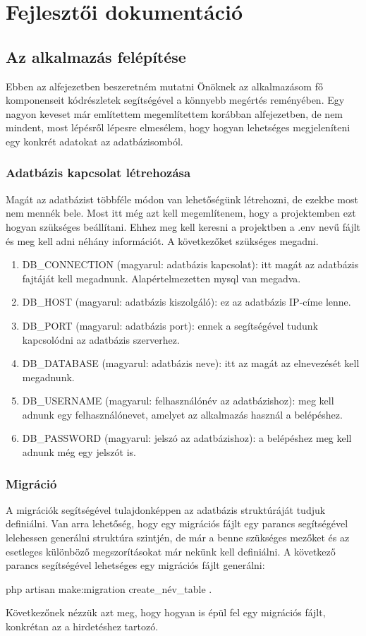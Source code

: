 \documentclass[]{thesis-ekf}
\theoremstyle{definition}
\theoremstyle{remark}
\begin{document}
	\chapter{Fejlesztői dokumentáció}
	\section{Az alkalmazás felépítése}
	Ebben az alfejezetben beszeretném mutatni Önöknek az alkalmazásom fő komponenseit kódrészletek segítségével a könnyebb megértés reményében. Egy nagyon keveset már említettem megemlítettem korábban  alfejezetben, de nem mindent, most lépésről lépesre elmesélem, hogy hogyan lehetséges megjeleníteni egy konkrét adatokat az adatbázisomból.
	\subsection{Adatbázis kapcsolat létrehozása}
	Magát az adatbázist többféle módon van lehetőségünk létrehozni, de ezekbe most nem mennék bele. Most itt még azt kell megemlítenem, hogy a projektemben ezt hogyan szükséges beállítani. Ehhez meg kell keresni a projektben a .env nevű fájlt és meg kell adni néhány információt. A következőket szükséges megadni.
	\begin{enumerate}
		\item DB\_CONNECTION (magyarul: adatbázis kapcsolat): itt magát az adatbázis fajtáját kell megadnunk. Alapértelmezetten mysql van megadva. 
		\item DB\_HOST (magyarul: adatbázis kiszolgáló): ez az adatbázis IP-címe lenne.
		\item DB\_PORT (magyarul: adatbázis port): ennek a segítségével tudunk kapcsolódni az adatbázis szerverhez. 
		\item DB\_DATABASE (magyarul: adatbázis neve): itt az magát az elnevezését kell megadnunk.
		\item DB\_USERNAME (magyarul: felhasználónév az adatbázishoz): meg kell adnunk egy felhasználónevet, amelyet az alkalmazás használ a belépéshez.
		\item DB\_PASSWORD (magyarul: jelszó az adatbázishoz): a belépéshez meg kell adnunk még egy jelszót is.
		
	\end{enumerate}
	\subsection{Migráció}
	A migrációk segítségével tulajdonképpen az adatbázis struktúráját tudjuk definiálni. Van arra lehetőség, hogy egy migrációs fájlt egy parancs segítségével lelehessen generálni struktúra szintjén, de már a benne szükséges mezőket és az esetleges különböző megszorításokat már nekünk kell definiálni. A következő parancs segítségével lehetséges egy migrációs fájlt generálni:
	\begin{center} 
		php artisan make:migration create\_név\_table .
	\end{center}
	Következőnek nézzük azt meg, hogy hogyan is épül fel egy migrációs fájlt, konkrétan az a hirdetéshez tartozó.
	
\end{document}
